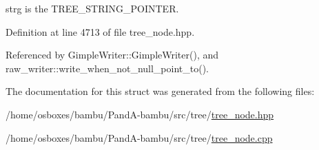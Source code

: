 strg is the T\+R\+E\+E\+\_\+\+S\+T\+R\+I\+N\+G\+\_\+\+P\+O\+I\+N\+T\+ER. 



Definition at line 4713 of file tree\+\_\+node.\+hpp.



Referenced by Gimple\+Writer\+::\+Gimple\+Writer(), and raw\+\_\+writer\+::write\+\_\+when\+\_\+not\+\_\+null\+\_\+point\+\_\+to().



The documentation for this struct was generated from the following files\+:\begin{DoxyCompactItemize}
\item 
/home/osboxes/bambu/\+Pand\+A-\/bambu/src/tree/\hyperlink{tree__node_8hpp}{tree\+\_\+node.\+hpp}\item 
/home/osboxes/bambu/\+Pand\+A-\/bambu/src/tree/\hyperlink{tree__node_8cpp}{tree\+\_\+node.\+cpp}\end{DoxyCompactItemize}

